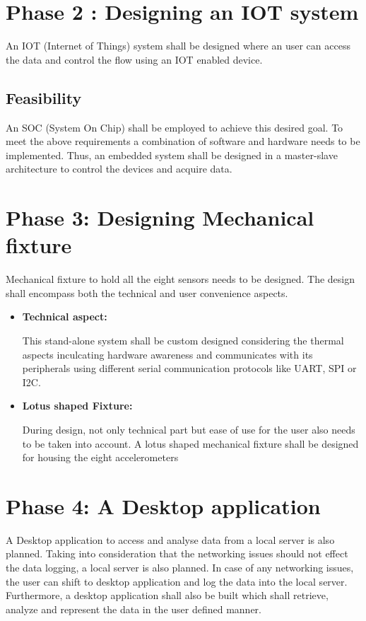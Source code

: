 \documentclass{FR16}
\begin{document}
\begin{enumerate}
\begin{figure}[H]
\label{fig6}
\end{figure}


\end{enumerate}

\newpage

\section{Phase 2 : Designing an IOT system}
An IOT (Internet of Things) system shall be designed where an user can access the data and control the flow using an IOT enabled device. 


\subsection{Feasibility}

An SOC (System On Chip) shall be employed to achieve this desired goal.  To meet the above requirements a combination of software and hardware needs to be implemented. Thus, an embedded system shall be designed in a master-slave architecture to control the devices and acquire data.

\newpage
\section{Phase 3: Designing Mechanical fixture}
Mechanical fixture to hold all the eight sensors needs to be designed. The design shall encompass both the technical and user convenience aspects.
        \begin{itemize}
            \item \textbf{ Technical aspect:} 
            
            This stand-alone system shall be custom designed considering the thermal aspects inculcating   hardware awareness and communicates with its peripherals  using different serial communication protocols like UART, SPI or I2C. 
            
            \item \textbf{ Lotus shaped Fixture:}
            
            During design, not only technical part but ease of use for the user also needs to be taken into account. A lotus shaped mechanical fixture shall be designed for housing the eight accelerometers  
        \end{itemize}



\newpage
\section{Phase 4: A Desktop application}
A Desktop application to access and analyse data from a local server is also planned. Taking into consideration that the networking issues should not effect the data logging, a local server is also planned. In case of any networking issues, the user can shift to desktop application and log the data into the local server. Furthermore, a desktop application shall also be built which shall retrieve, analyze and represent the data in the user defined manner.
\newpage
\end{document}
